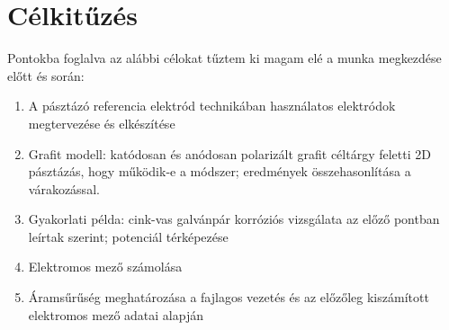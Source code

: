 \chapter{Célkitűzés} \label{celkituzes}
\pagestyle{headings}

Pontokba foglalva az alábbi célokat tűztem ki magam elé a munka megkezdése előtt és során:

\begin{enumerate}
\item  A pásztázó referencia elektród technikában használatos elektródok megtervezése és elkészítése 
\item  Grafit modell: katódosan és anódosan polarizált grafit céltárgy feletti 2D pásztázás, hogy működik-e a módszer; eredmények összehasonlítása a várakozással.
\item  Gyakorlati példa: cink-vas galvánpár korróziós vizsgálata az előző pontban leírtak szerint; potenciál térképezése
\item  Elektromos mező számolása
\item  Áramsűrűség meghatározása a fajlagos vezetés és az előzőleg kiszámított elektromos mező adatai alapján
\end{enumerate}


